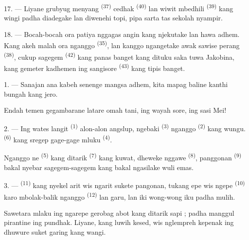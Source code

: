 17. --- Liyane grubyug menyang 
\textsuperscript{(37)} cedhak  \textsuperscript{(40)} lan
wiwit mbedhili  \textsuperscript{(39)} kang wingi
padha diadegake lan diwenehi topi, pipa sarta tas sekolah nyampir.

18. --- Bocah-bocah ora patiya nggagas angin kang njekutake lan hawa
adhem. Kang akeh malah ora nganggo 
\textsuperscript{(35)}, lan kanggo ngangetake awak sawise perang
 \textsuperscript{(38)}, cukup sagegem 
\textsuperscript{(42)} kang panas banget kang dituku saka 
tuwa Jakobina, kang gemeter kadhemen ing sangisore
 \textsuperscript{(43)} kang tipis banget.

\VUsaut{3.0mm}
\VUsaut{3.0mm}

\VUsaut{4.0mm}
\VUsaut{4.0mm}

1. --- Sanajan ana kabeh senenge mangsa adhem, kita mapag baline
 kanthi bungah kang jero.

Endah temen gegambarane latare omah tani, ing wayah sore, ing sasi Mei!

2. --- Ing wates langit  \textsuperscript{(1)} alon-alon
angslup, ngebaki  \textsuperscript{(3)} nganggo
 \textsuperscript{(2)} kang wungu. 
\textsuperscript{(6)} kang sregep gage-gage mluku 
\textsuperscript{(4)}.

Nganggo ne \textsuperscript{(5)} kang ditarik 
\textsuperscript{(7)} kang kuwat, dheweke nggawe 
\textsuperscript{(8)}, panggonan 
\textsuperscript{(9)} bakal nyebar  sagegem-sagegem kang
bakal ngasilake wuli emas.

3. ---  \textsuperscript{(11)} kang nyekel arit wis
ngarit sukete pangonan, tukang epe wis ngepe 
\textsuperscript{(10)} karo mbolak-balik nganggo 
\textsuperscript{(12)} lan garu, lan iki wong-wong iku padha mulih.

Sawetara mlaku ing ngarepe gerobag abot kang ditarik sapi ; padha
manggul pirantine ing pundhak. Liyane, kang luwih kesed, wis nglempreh
kepenak ing dhuwure suket garing kang wangi.

